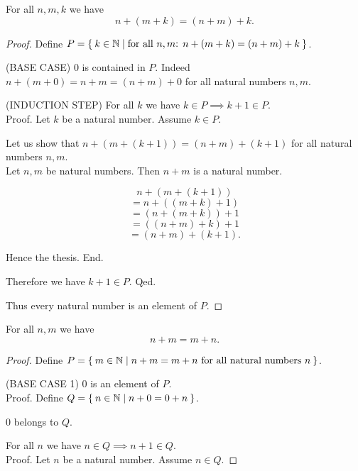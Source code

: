 \documentclass[../../natural-numbers.ftl.tex]{subfiles}
\begin{document}
  \begin{forthel}
    \begin{proposition}[NN 01 02 468785]
      For all $n,m,k$ we have \[ n + (m + k) = (n + m) + k. \]
    \end{proposition}
    \begin{proof}
      Define $P = \Set{ k \in \mathbb{N} | \text{for all $n,m$: $n + (m + k) = (n + m) + k$}}$.

      (BASE CASE) $0$ is contained in $P$.
      Indeed $n + (m + 0) = n + m = (n + m) + 0$ for all natural numbers $n,m$.

      (INDUCTION STEP) For all $k$ we have $k \in P \implies k + 1 \in P$. \\
      Proof.
        Let $k$ be a natural number.
         Assume $k \in P$.

        Let us show that $n + (m + (k + 1)) = (n + m) + (k + 1)$ for all natural numbers $n,m$. \\
          Let $n,m$ be natural numbers.
          Then $n + m$ is a natural number.

          \[   n + (m + (k + 1)) \]
          \[ = n + ((m + k) + 1) \]  %
          \[ = (n + (m + k)) + 1 \]  %
          \[ = ((n + m) + k) + 1 \]  %
          \[ = (n + m) + (k + 1). \] %

          Hence the thesis.
        End.

        Therefore we have $k + 1 \in P$.
      Qed.

      Thus every natural number is an element of $P$.
    \end{proof}


    \begin{proposition}[NN 01 02 273100]
      For all $n,m$ we have \[ n + m = m + n. \]
    \end{proposition}
    \begin{proof}
      Define $P = \Set{m \in \mathbb{N} | \text{$n + m = m + n$ for all natural numbers $n$}}$.

      (BASE CASE 1) $0$ is an element of $P$. \\
      Proof.
        Define $Q = \Set{n \in \mathbb{N} | n + 0 = 0 + n}$.

        $0$ belongs to $Q$.

        For all $n$ we have $n \in Q \implies n + 1 \in Q$. \\
        Proof.
          Let $n$ be a natural number.
          Assume $n \in Q$.


\end{proof}
\end{forthel}
\end{document}
